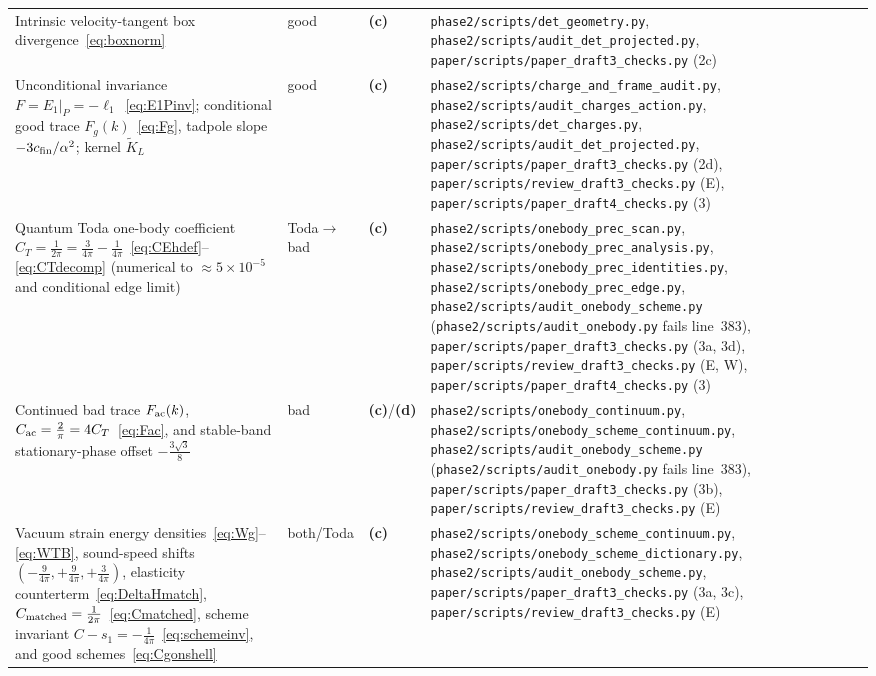 \documentclass[11pt,a4paper]{article}
\newcommand{\lab}[1]{{\normalfont\sffamily\footnotesize\bfseries(#1)}}
\newcommand{\Lc}{\lab{c}}
\newcommand{\Ld}{\lab{d}}
\newcommand{\scr}[1]{\nolinkurl{#1}}
\theoremstyle{remark}
\begin{document}
\begin{longtable}{@{}>{\raggedright}p{5.4cm}>{\raggedright}p{1.3cm}>{\raggedright}p{0.75cm}>{\raggedright\arraybackslash}p{6.55cm}@{}}
Intrinsic velocity-tangent box divergence~\eqref{eq:boxnorm} & good & \Lc & \scr{phase2/scripts/det_geometry.py}, \scr{phase2/scripts/audit_det_projected.py}, \scr{paper/scripts/paper_draft3_checks.py} (2c)\\
Unconditional invariance $F=E_1|_P=-\ell_1$~\eqref{eq:E1Pinv}; conditional good trace $F_g(k)$~\eqref{eq:Fg}, tadpole slope $-3c_{\rm fin}/\alpha^2$; kernel $\widetilde K_L$ & good & \Lc & \scr{phase2/scripts/charge_and_frame_audit.py}, \scr{phase2/scripts/audit_charges_action.py}, \scr{phase2/scripts/det_charges.py}, \scr{phase2/scripts/audit_det_projected.py}, \scr{paper/scripts/paper_draft3_checks.py} (2d), \nolinkurl{paper/scripts/review_draft3_checks.py} (E), \nolinkurl{paper/scripts/paper_draft4_checks.py} (3)\\
Quantum Toda one-body coefficient $C_T=\tfrac1{2\pi}=\tfrac3{4\pi}-\tfrac1{4\pi}$~\eqref{eq:CEhdef}--\eqref{eq:CTdecomp} (numerical to $\approx5\times10^{-5}$ and conditional edge limit) & Toda$\to$bad & \Lc & \scr{phase2/scripts/onebody_prec_scan.py}, \scr{phase2/scripts/onebody_prec_analysis.py}, \scr{phase2/scripts/onebody_prec_identities.py}, \scr{phase2/scripts/onebody_prec_edge.py}, \scr{phase2/scripts/audit_onebody_scheme.py} (\scr{phase2/scripts/audit_onebody.py} fails line~383), \scr{paper/scripts/paper_draft3_checks.py} (3a, 3d), \nolinkurl{paper/scripts/review_draft3_checks.py} (E, W), \nolinkurl{paper/scripts/paper_draft4_checks.py} (3)\\
Continued bad trace $F_{\rm ac}(k)$, $C_{\rm ac}=\tfrac2\pi=4C_T$~\eqref{eq:Fac}, and stable-band stationary-phase offset $-\frac{3\sqrt3}8$ & bad & \Lc/\Ld & \scr{phase2/scripts/onebody_continuum.py}, \scr{phase2/scripts/onebody_scheme_continuum.py}, \scr{phase2/scripts/audit_onebody_scheme.py} (\scr{phase2/scripts/audit_onebody.py} fails line~383), \scr{paper/scripts/paper_draft3_checks.py} (3b), \nolinkurl{paper/scripts/review_draft3_checks.py} (E)\\
Vacuum strain energy densities~\eqref{eq:Wg}--\eqref{eq:WTB}, sound-speed shifts $(-\tfrac9{4\pi},+\tfrac9{4\pi},+\tfrac3{4\pi})$, elasticity counterterm~\eqref{eq:DeltaHmatch}, $C_{\rm matched}=\tfrac1{2\pi}$~\eqref{eq:Cmatched}, scheme invariant $C-s_1=-\tfrac1{4\pi}$~\eqref{eq:schemeinv}, and good schemes~\eqref{eq:Cgonshell} & both/Toda & \Lc & \scr{phase2/scripts/onebody_scheme_continuum.py}, \scr{phase2/scripts/onebody_scheme_dictionary.py}, \scr{phase2/scripts/audit_onebody_scheme.py}, \scr{paper/scripts/paper_draft3_checks.py} (3a, 3c), \nolinkurl{paper/scripts/review_draft3_checks.py} (E)\\

\end{longtable}
\end{document}
